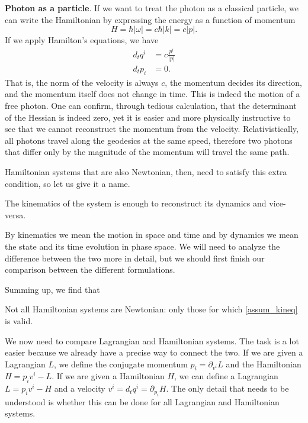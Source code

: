 \textbf{Photon as a particle}. If we want to treat the photon as a classical particle, we can write the Hamiltonian by expressing the energy as a function of momentum
\begin{equation}
	H=\hbar | \omega| = c \hbar |k| = c |p|.
\end{equation}
If we apply Hamilton's equations, we have
\begin{equation}
	\begin{aligned}
		d_t q^i &= c \frac{p^i}{|p|} \\
		d_t p_i &= 0.
	\end{aligned}
\end{equation}
That is, the norm of the velocity is always $c$, the momentum decides its direction, and the momentum itself does not change in time. This is indeed the motion of a free photon. One can confirm, through tedious calculation, that the determinant of the Hessian is indeed zero, yet it is easier and more physically instructive to see that we cannot reconstruct the momentum from the velocity. Relativistically, all photons travel along the geodesics at the same speed, therefore two photons that differ only by the magnitude of the momentum will travel the same path.

Hamiltonian systems that are also Newtonian, then, need to satisfy this extra condition, so let us give it a name.
\renewcommand{\theassump}{KE}%
\begin{assump}\label{assum_kineq}
	The kinematics of the system is enough to reconstruct its dynamics and vice-versa.
\end{assump}
\renewcommand{\theassump}{\Roman{assump}}%
By kinematics we mean the motion in space and time and by dynamics we mean the state and its time evolution in phase space. We will need to analyze the difference between the two more in detail, but we should first finish our comparison between the different formulations.

Summing up, we find that
\begin{insight}
	Not all Hamiltonian systems are Newtonian: only those for which  \ref{assum_kineq} is valid.
\end{insight}


We now need to compare Lagrangian and Hamiltonian systems. The task is a lot easier because we already have a precise way to connect the two. If we are given a Lagrangian $L$, we define the conjugate momentum $p_i = \partial_{v^i} L$ and the Hamiltonian $H = p_i v^i - L$. If we are given a Hamiltonian $H$, we can define a Lagrangian $L = p_i v^i - H$ and a velocity $v^i = d_t q^i = \partial_{p_i} H$. The only detail that needs to be understood is whether this can be done for all Lagrangian and Hamiltonian systems.


